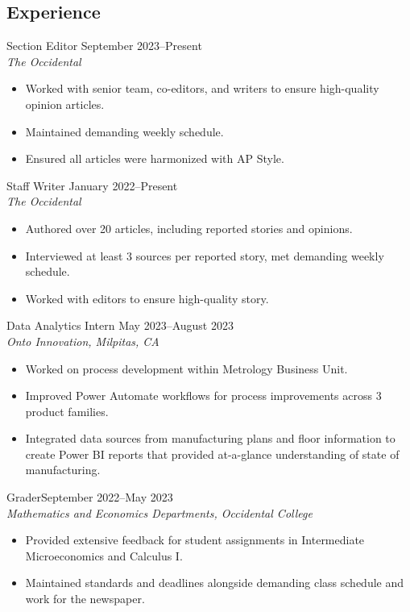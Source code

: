 \documentclass[margin, 10pt]{res} %
\begin{document}
\begin{resume}
\section{\sc Experience}
Section Editor \hfill September 2023--Present \\
\textit{The Occidental}
\begin{itemize}\itemsep -2pt
  \item Worked with senior team, co-editors, and writers to ensure high-quality opinion articles.
  \item Maintained demanding weekly schedule.
  \item Ensured all articles were harmonized with AP Style.
\end{itemize}
Staff Writer \hfill January 2022--Present \\
\textit{The Occidental} 
\begin{itemize} \itemsep -2pt
\item Authored over 20 articles, including reported stories and opinions.
\item Interviewed at least 3 sources per reported story, met demanding weekly schedule.
\item Worked with editors to ensure high-quality story.
\end{itemize} 
{Data Analytics Intern} \hfill May 2023--August 2023 \\
\textit{Onto Innovation, Milpitas, CA}
\begin{itemize} \itemsep -2pt %
\item Worked on process development within Metrology Business Unit.
\item Improved Power Automate workflows for process improvements across 3 product families.
\item Integrated data sources from manufacturing plans and floor information to create Power BI reports that provided at-a-glance understanding of state of manufacturing.
\end{itemize}
 


Grader\hfill September 2022--May 2023\\
\textit{Mathematics and Economics Departments, Occidental College}
\begin{itemize}\itemsep -2pt
  \item Provided extensive feedback for student assignments in Intermediate Microeconomics and Calculus I.
  \item Maintained standards and deadlines alongside demanding class schedule and work for the newspaper.
\end{itemize}


\end{resume}
\end{document}
